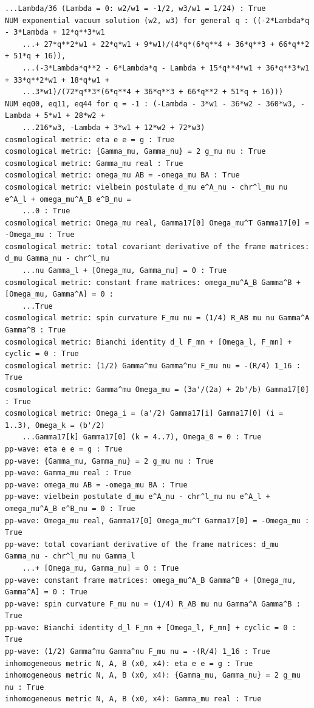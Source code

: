 \documentclass[10pt,a4paper]{article}
\begin{document}
\begin{Verbatim}[fontsize=\small,frame=single,framesep=2mm]
    ...Lambda/36 (Lambda = 0: w2/w1 = -1/2, w3/w1 = 1/24) : True
NUM exponential vacuum solution (w2, w3) for general q : ((-2*Lambda*q - 3*Lambda + 12*q**3*w1
    ...+ 27*q**2*w1 + 22*q*w1 + 9*w1)/(4*q*(6*q**4 + 36*q**3 + 66*q**2 + 51*q + 16)),
    ...(-3*Lambda*q**2 - 6*Lambda*q - Lambda + 15*q**4*w1 + 36*q**3*w1 + 33*q**2*w1 + 18*q*w1 +
    ...3*w1)/(72*q**3*(6*q**4 + 36*q**3 + 66*q**2 + 51*q + 16)))
NUM eq00, eq11, eq44 for q = -1 : (-Lambda - 3*w1 - 36*w2 - 360*w3, -Lambda + 5*w1 + 28*w2 +
    ...216*w3, -Lambda + 3*w1 + 12*w2 + 72*w3)
cosmological metric: eta e e = g : True
cosmological metric: {Gamma_mu, Gamma_nu} = 2 g_mu nu : True
cosmological metric: Gamma_mu real : True
cosmological metric: omega_mu AB = -omega_mu BA : True
cosmological metric: vielbein postulate d_mu e^A_nu - chr^l_mu nu e^A_l + omega_mu^A_B e^B_nu =
    ...0 : True
cosmological metric: Omega_mu real, Gamma17[0] Omega_mu^T Gamma17[0] = -Omega_mu : True
cosmological metric: total covariant derivative of the frame matrices: d_mu Gamma_nu - chr^l_mu
    ...nu Gamma_l + [Omega_mu, Gamma_nu] = 0 : True
cosmological metric: constant frame matrices: omega_mu^A_B Gamma^B + [Omega_mu, Gamma^A] = 0 :
    ...True
cosmological metric: spin curvature F_mu nu = (1/4) R_AB mu nu Gamma^A Gamma^B : True
cosmological metric: Bianchi identity d_l F_mn + [Omega_l, F_mn] + cyclic = 0 : True
cosmological metric: (1/2) Gamma^mu Gamma^nu F_mu nu = -(R/4) 1_16 : True
cosmological metric: Gamma^mu Omega_mu = (3a'/(2a) + 2b'/b) Gamma17[0] : True
cosmological metric: Omega_i = (a'/2) Gamma17[i] Gamma17[0] (i = 1..3), Omega_k = (b'/2)
    ...Gamma17[k] Gamma17[0] (k = 4..7), Omega_0 = 0 : True
pp-wave: eta e e = g : True
pp-wave: {Gamma_mu, Gamma_nu} = 2 g_mu nu : True
pp-wave: Gamma_mu real : True
pp-wave: omega_mu AB = -omega_mu BA : True
pp-wave: vielbein postulate d_mu e^A_nu - chr^l_mu nu e^A_l + omega_mu^A_B e^B_nu = 0 : True
pp-wave: Omega_mu real, Gamma17[0] Omega_mu^T Gamma17[0] = -Omega_mu : True
pp-wave: total covariant derivative of the frame matrices: d_mu Gamma_nu - chr^l_mu nu Gamma_l
    ...+ [Omega_mu, Gamma_nu] = 0 : True
pp-wave: constant frame matrices: omega_mu^A_B Gamma^B + [Omega_mu, Gamma^A] = 0 : True
pp-wave: spin curvature F_mu nu = (1/4) R_AB mu nu Gamma^A Gamma^B : True
pp-wave: Bianchi identity d_l F_mn + [Omega_l, F_mn] + cyclic = 0 : True
pp-wave: (1/2) Gamma^mu Gamma^nu F_mu nu = -(R/4) 1_16 : True
inhomogeneous metric N, A, B (x0, x4): eta e e = g : True
inhomogeneous metric N, A, B (x0, x4): {Gamma_mu, Gamma_nu} = 2 g_mu nu : True
inhomogeneous metric N, A, B (x0, x4): Gamma_mu real : True

\end{Verbatim}
\end{document}
